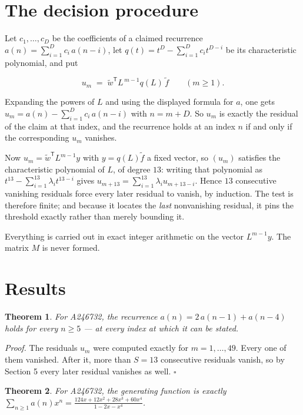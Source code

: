 \documentclass[11pt]{article}
\newtheorem{theorem}{Theorem}
\theoremstyle{definition}
\begin{document}
\section{The decision procedure}

Let $c_1,\dots,c_D$ be the coefficients of a claimed recurrence $a(n) = \sum_{i=1}^{D} c_i\,a(n-i)$, let $q(t) = t^{D} - \sum_{i=1}^{D} c_i t^{D-i}$ be its characteristic polynomial, and put

\[u_m \;=\; \tilde w^{\mathsf T} L^{\,m-1} q(L)\,\tilde f \qquad (m \ge 1).\]

Expanding the powers of $L$ and using the displayed formula for $a$, one gets $u_m = a(n) - \sum_{i=1}^{D} c_i\,a(n-i)$ with $n = m + D$. So $u_m$ is exactly the residual of the claim at that index, and the recurrence holds at an index $n$ if and only if the corresponding $u_m$ vanishes.

Now $u_m = \tilde w^{\mathsf T} L^{m-1} y$ with $y = q(L)\tilde f$ a fixed vector, so $(u_m)$ satisfies the characteristic polynomial of $L$, of degree $13$: writing that polynomial as $t^{13} - \sum_{i=1}^{13} \lambda_i t^{13-i}$ gives $u_{m+13} = \sum_{i=1}^{13} \lambda_i u_{m+13-i}$. Hence $13$ consecutive vanishing residuals force every later residual to vanish, by induction. The test is therefore finite; and because it locates the {\itshape last} nonvanishing residual, it pins the threshold exactly rather than merely bounding it.

Everything is carried out in exact integer arithmetic on the vector $L^{m-1}y$. The matrix $M$ is never formed.

\section{Results}

\begin{theorem} For A246732, the recurrence $a(n) = 2\,a(n-1) + a(n-4)$ holds for every $n \ge 5$ --- at every index at which it can be stated.\end{theorem}

{\itshape Proof.} The residuals $u_m$ were computed exactly for $m = 1,\dots,49$. Every one of them vanished. After it, more than $S = 13$ consecutive residuals vanish, so by Section 5 every later residual vanishes as well. $\square$

\begin{theorem} For A246732, the generating function is exactly $\sum_{n\ge 1} a(n)x^n = \frac{124x + 12x^{2} + 28x^{3} + 60x^{4}}{1 - 2x - x^{4}}$.\end{theorem}
\end{document}
